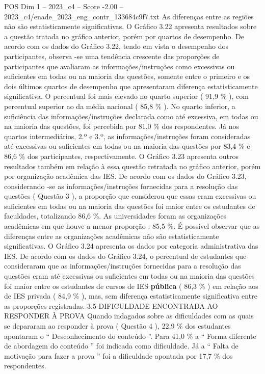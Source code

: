 \begin{textsample}{POS Dim 1 – 2023\_c4 – Score -2.00 – 2023\_c4/enade\_2023\_eng\_contr\_133684c9f7.txt}
As diferenças entre as regiões não são estatisticamente significativas.
O Gráfico 3.22 apresenta resultados sobre a questão tratada no gráfico anterior, porém por quartos de desempenho.
De acordo com os dados do Gráfico 3.22, tendo em vista o desempenho dos participantes, observa -se uma tendência crescente das proporções de participantes que avaliaram as informações/instruções como excessivas ou suficientes em todas ou na maioria das questões, somente entre o primeiro e os dois últimos quartos de desempenho que apresentaram diferença estatisticamente significativa.
O percentual foi mais elevado no quarto superior ( 91,9 \% ), com percentual superior ao da média nacional ( 85,8 \% ).
No quarto inferior, a suficiência das informações/instruções declarada como até excessiva, em todas ou na maioria das questões, foi percebida por 81,0 \% dos respondentes.
Já nos quartos intermediários, 2.º e 3.º, as informações/instruções foram consideradas até excessivas ou suficientes em todas ou na maioria das questões por 83,4 \% e 86,6 \% dos participantes, respectivamente.
O Gráfico 3.23 apresenta outros resultados também em relação à essa questão retratada no gráfico anterior, porém por organização acadêmica das IES.
De acordo com os dados do Gráfico 3.23, considerando -se as informações/instruções fornecidas para a resolução das questões ( Questão 3 ), a proporção que considerou que essas eram excessivas ou suficientes em todas ou na maioria das questões foi maior entre os estudantes de faculdades, totalizando 86,6 \%.
As universidades foram as organizações acadêmicas em que houve a menor proporção : 85,5 \%.
É possível observar que as diferenças entre as organizações acadêmicas não são estatisticamente significativas.
O Gráfico 3.24 apresenta os dados por categoria administrativa das IES.
De acordo com os dados do Gráfico 3.24, o percentual de estudantes que consideraram que as informações/instruções fornecidas para a resolução das questões eram até excessivas ou suficientes em todas ou na maioria das questões foi maior entre os estudantes de cursos de IES \textbf{pública} ( 86,3 \% ) em relação aos de IES privada ( 84,9 \% ), mas, sem diferença estatisticamente significativa entre as proporções registradas. 3.5 DIFICULDADE ENCONTRADA AO RESPONDER À PROVA Quando indagados sobre as dificuldades com as quais se depararam ao responder à prova ( Questão 4 ), 22,9 \% dos estudantes apontaram o “ Desconhecimento do conteúdo ”.
Para 41,0 \% a “ Forma diferente de abordagem do conteúdo ” foi indicada como dificuldade.
Já a “ Falta de motivação para fazer a prova ” foi a dificuldade apontada por 17,7 \% dos respondentes.

\end{textsample}
